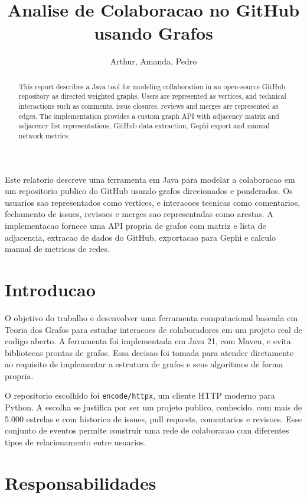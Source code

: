 \documentclass[12pt]{article}
\title{Analise de Colaboracao no GitHub usando Grafos}
\author{Arthur\inst{1}, Amanda\inst{1}, Pedro\inst{1}}
\begin{document}
\maketitle

\begin{abstract}
This report describes a Java tool for modeling collaboration in an open-source
GitHub repository as directed weighted graphs. Users are represented as
vertices, and technical interactions such as comments, issue closures, reviews
and merges are represented as edges. The implementation provides a custom graph
API with adjacency matrix and adjacency list representations, GitHub data
extraction, Gephi export and manual network metrics.
\end{abstract}

\begin{resumo}
Este relatorio descreve uma ferramenta em Java para modelar a colaboracao em
um repositorio publico do GitHub usando grafos direcionados e ponderados. Os
usuarios sao representados como vertices, e interacoes tecnicas como
comentarios, fechamento de issues, revisoes e merges sao representadas como
arestas. A implementacao fornece uma API propria de grafos com matriz e lista
de adjacencia, extracao de dados do GitHub, exportacao para Gephi e calculo
manual de metricas de redes.
\end{resumo}

\section{Introducao}

O objetivo do trabalho e desenvolver uma ferramenta computacional baseada em
Teoria dos Grafos para estudar interacoes de colaboradores em um projeto real
de codigo aberto. A ferramenta foi implementada em Java 21, com Maven, e evita
bibliotecas prontas de grafos. Essa decisao foi tomada para atender diretamente
ao requisito de implementar a estrutura de grafos e seus algoritmos de forma
propria.

O repositorio escolhido foi \texttt{encode/httpx}, um cliente HTTP moderno para
Python. A escolha se justifica por ser um projeto publico, conhecido, com mais
de 5.000 estrelas e com historico de issues, pull requests, comentarios e
revisoes. Esse conjunto de eventos permite construir uma rede de colaboracao
com diferentes tipos de relacionamento entre usuarios.

\section{Responsabilidades}
\end{document}
